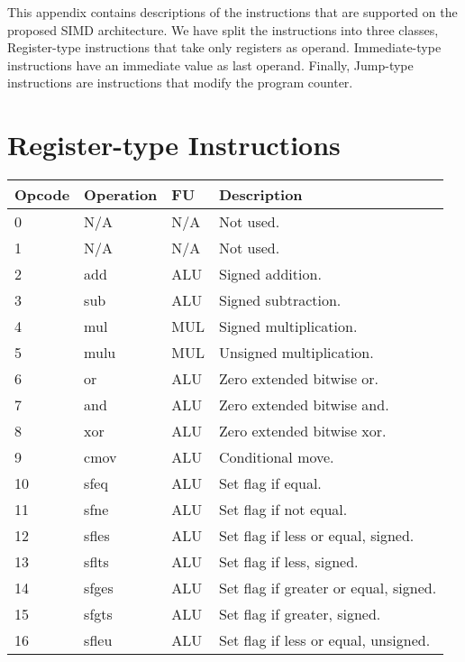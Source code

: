 
This appendix contains descriptions of the instructions that are supported on the proposed SIMD architecture. We have split the instructions into three classes, Register-type instructions that take only registers as operand. Immediate-type instructions have an immediate value as last operand. Finally, Jump-type instructions are instructions that modify the program counter.

\section{Register-type Instructions}
\begin{table}[h]
\begin{center}
\begin{tabular}{@{}p{}p{}p{}p{}@{}}
\toprule
\textbf{Opcode} & \textbf{Operation} & \textbf{FU} & \textbf{Description}\\ \hline
0 & N/A & N/A		& Not used. \\ 
1 & N/A & N/A		& Not used. \\ 
2 & add & ALU		& Signed addition. \\ 
3 & sub & ALU		& Signed subtraction. \\ 
4 & mul & MUL	& Signed multiplication. \\ 
5 & mulu & MUL	& Unsigned multiplication. \\ 
6 & or & ALU		& Zero extended bitwise or. \\ 
7 & and & ALU		& Zero extended bitwise and. \\ 
8 & xor & ALU	& Zero extended bitwise xor. \\ 
9 & cmov & ALU	& Conditional move. \\ 
10 & sfeq & ALU	& Set flag if equal. \\ 
11 & sfne & ALU	& Set flag if not equal. \\ 
12 & sfles & ALU	& Set flag if less or equal, signed. \\ 
13 & sflts & ALU	& Set flag if less, signed. \\ 
14 & sfges & ALU	& Set flag if greater or equal, signed. \\ 
15 & sfgts & ALU	& Set flag if greater, signed. \\ 
16 & sfleu & ALU	& Set flag if less or equal, unsigned. \\ 

\end{tabular}
\end{center}
\end{table}
